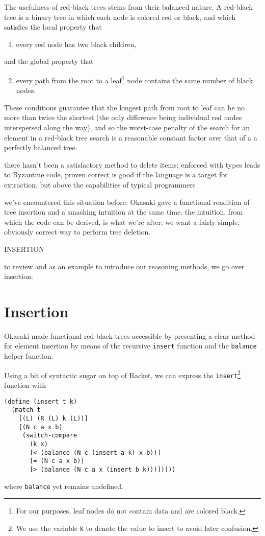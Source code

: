 \documentclass[preprint]{sigplanconf}
\begin{document}
The usefulness of red-black trees stems from their balanced nature. A red-black tree is a binary tree in which each node is colored red or black, and which satisfies the local property that
\begin{enumerate}
\item every red node has two black children,
\end{enumerate}
and the global property that
\begin{enumerate}
\setcounter{enumi}{1}
\item every path from the root to a leaf\footnote{For our purposes, leaf nodes do not contain data and are colored black.} node contains the same number of black nodes.
\end{enumerate}
These conditions guarantee that the longest path from root to leaf can be no more than twice the shortest (the only difference being individual red nodes interspersed along the way), and so the worst-case penalty of the search for an element in a red-black tree search is a reasonable constant factor over that of a a perfectly balanced tree.

there hasn't been a satisfactory method to delete items; enforced with types leads to Byzantine code, proven correct is good if the language is a target for extraction, but above the capabilities of typical programmers

we've encountered this situation before: Okasaki gave a functional rendition of tree insertion and a smashing intuition at the same time. the intuition, from which the code can be derived, is what we're after: we want a fairly simple, obviously correct way to perform tree deletion.

INSERTION

to review and as an example to introduce our reasoning methods, we go over insertion.

\section{Insertion}

Okasaki \cite{okasaki1999functional} made functional red-black trees accessible by presenting a clear method for element insertion by means of the recursive \texttt{insert} function and the \texttt{balance} helper function.

Using a bit of syntactic sugar on top of Racket, we can express the \texttt{insert}\footnote{We use the variable \texttt{k} to denote the value to insert to avoid later confusion.} function with
\begin{verbatim}
(define (insert t k)
  (match t
    [(L) (R (L) k (L))]
    [(N c a x b)
     (switch-compare
       (k x)
       [< (balance (N c (insert a k) x b))]
       [= (N c a x b)]
       [> (balance (N c a x (insert b k)))])]))
\end{verbatim}
where \texttt{balance} yet remains undefined.
\end{document}
